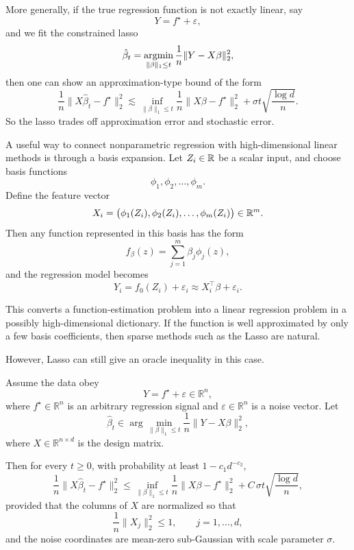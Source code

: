 More generally, if the true regression function is not exactly linear, say
\[
Y=f^\star + \varepsilon,
\]
and we fit the constrained lasso
\[
\hat\beta_t
=
\argmin_{\|\beta\|_1\le t}\frac1n\|Y-X\beta\|_2^2,
\]
then one can show an approximation-type bound of the form
\[
\frac1n\|X\hat\beta_t-f^\star\|_2^2
\lesssim
\inf_{\|\beta\|_1\le t}\frac1n\|X\beta-f^\star\|_2^2
+
\sigma t\sqrt{\frac{\log d}{n}}.
\]
So the lasso trades off approximation error and stochastic error.

\begin{remark}
   A useful way to connect nonparametric regression with high-dimensional linear methods is through a basis expansion. Let $Z_i\in\mathbb{R}$ be a scalar input, and choose basis functions
\[
\phi_1,\phi_2,\dots,\phi_m.
\]
Define the feature vector
\[
X_i = \bigl(\phi_1(Z_i),\phi_2(Z_i),\dots,\phi_m(Z_i)\bigr)\in\mathbb{R}^m.
\]
Then any function represented in this basis has the form
\[
f_\beta(z)=\sum_{j=1}^m \beta_j \phi_j(z),
\]
and the regression model becomes
\[
Y_i = f_0(Z_i)+\varepsilon_i
\approx X_i^\top \beta + \varepsilon_i.
\]

This converts a function-estimation problem into a linear regression problem in a possibly high-dimensional dictionary.  
If the function is well approximated by only a few basis coefficients, then sparse methods such as the Lasso are natural. 
\end{remark}

However, Lasso can still give an oracle inequality in this case.

\begin{prop}
Assume the data obey
\[
Y=f^\star+\varepsilon \in \mathbb{R}^n,
\]
where \(f^\star\in\mathbb{R}^n\) is an arbitrary regression signal and
\(\varepsilon\in\mathbb{R}^n\) is a noise vector. Let
\[
\hat\beta_t \in \arg\min_{\|\beta\|_1\le t}\frac{1}{n}\|Y-X\beta\|_2^2,
\]
where \(X\in\mathbb{R}^{n\times d}\) is the design matrix.

Then for every \(t\ge 0\), with probability at least \(1-c_1 d^{-c_2}\),
\[
\frac{1}{n}\|X\hat\beta_t-f^\star\|_2^2
\le
\inf_{\|\beta\|_1\le t}\frac{1}{n}\|X\beta-f^\star\|_2^2
+
C\,\sigma t\sqrt{\frac{\log d}{n}},
\]
provided that the columns of \(X\) are normalized so that
\[
\frac{1}{n}\|X_j\|_2^2\le 1,\qquad j=1,\dots,d,
\]
and the noise coordinates are mean-zero sub-Gaussian with scale parameter \(\sigma\).
\end{prop}

